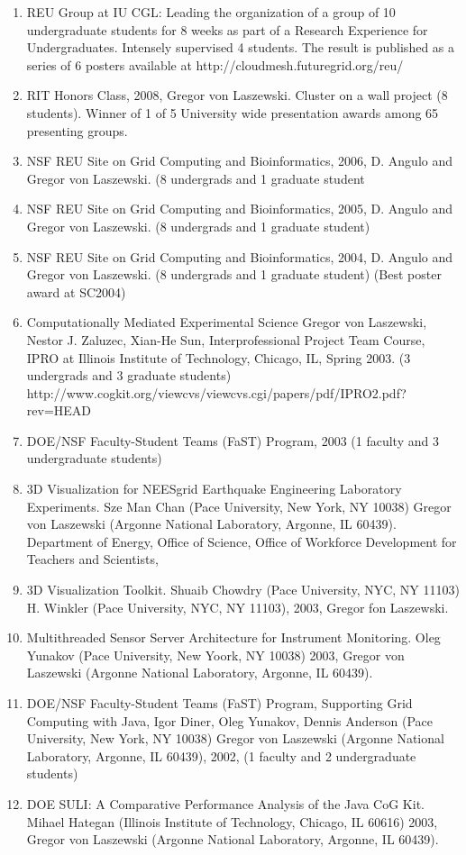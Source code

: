 \documentclass{article}
\renewcommand{\url}[1]{\href{#1}{\faExternalLink}}
\begin{document}
\begin{enumerate}
\item  REU Group at IU CGL: Leading the organization of  a group of 10 undergraduate students for 8 weeks as part of a Research Experience for Undergraduates. Intensely supervised 4 students. The result is published as a series of 6 posters available at http://cloudmesh.futuregrid.org/reu/
\item   RIT Honors Class, 2008, Gregor von Laszewski. Cluster on a wall project (8 students). Winner of 1 of 5 University wide presentation awards among 65 presenting groups.
\item  NSF REU Site on Grid Computing and Bioinformatics, 2006, D. Angulo and Gregor von Laszewski. (8 undergrads and 1 graduate student 
\item  NSF REU Site on Grid Computing and Bioinformatics, 2005, D. Angulo and Gregor von Laszewski. (8 undergrads and 1 graduate student) 
\item  NSF REU Site on Grid Computing and Bioinformatics, 2004, D. Angulo and Gregor von Laszewski. (8 undergrads and 1 graduate student) (Best poster award at SC2004) 
\item  Computationally Mediated Experimental Science Gregor von Laszewski, Nestor J. Zaluzec, Xian-He Sun, Interprofessional Project Team Course, IPRO at Illinois Institute of Technology, Chicago, IL, Spring 2003. (3 undergrads and 3 graduate students) http://www.cogkit.org/viewcvs/viewcvs.cgi/papers/pdf/IPRO2.pdf?rev=HEAD 
\item  DOE/NSF Faculty-Student Teams (FaST) Program, 2003 (1 faculty and 3 undergraduate students) \url{http://www.anl.gov/Media_Center/logos20-3/fasttrack.htm, http://www.scied.science.doe.gov/scied/Abstracts2003/ANLcs.htm} 
\item  3D Visualization for NEESgrid Earthquake Engineering Laboratory Experiments. Sze Man Chan (Pace University, New York, NY 10038) Gregor von Laszewski (Argonne National Laboratory, Argonne, IL 60439). Department of Energy, Office of Science, Office of Workforce Development for Teachers and Scientists, 
\item  3D Visualization Toolkit. Shuaib Chowdry (Pace University, NYC, NY 11103) H. Winkler (Pace University, NYC, NY 11103), 2003, Gregor fon Laszewski. 
\item  Multithreaded Sensor Server Architecture for Instrument Monitoring. Oleg Yunakov (Pace University, New Yoork, NY 10038) 2003, Gregor von Laszewski (Argonne National Laboratory, Argonne, IL 60439). 
\item  DOE/NSF Faculty-Student Teams (FaST) Program, Supporting Grid Computing with Java, Igor Diner, Oleg Yunakov, Dennis Anderson (Pace University, New York, NY 10038) Gregor von Laszewski (Argonne National Laboratory, Argonne, IL 60439), 2002, \url{http://www.anl.gov/Media_Center/News/2002/news020822.htm} (1 faculty and 2 undergraduate students)  
\item  DOE SULI: A Comparative Performance Analysis of the Java CoG Kit. Mihael Hategan (Illinois Institute of Technology, Chicago, IL 60616) 2003, Gregor von Laszewski (Argonne National Laboratory, Argonne, IL 60439). 
\end{enumerate}
    
\end{document}
